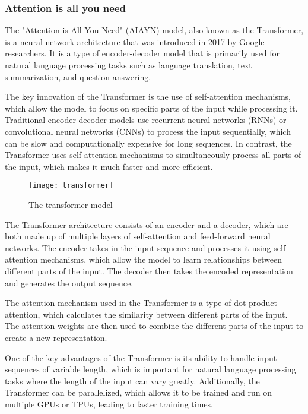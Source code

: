 \subsubsection{Attention is all you need}

The "Attention is All You Need" (AIAYN) model, also known as the Transformer, is a neural network architecture that was introduced in 2017 by Google researchers.
It is a type of encoder-decoder model that is primarily used for natural language processing tasks such as language translation, text summarization, and question answering.

The key innovation of the Transformer is the use of self-attention mechanisms, which allow the model to focus on specific parts of the input while processing it.
Traditional encoder-decoder models use recurrent neural networks (RNNs) or convolutional neural networks (CNNs) to process the input sequentially, which can be slow and computationally expensive for long sequences.
In contrast, the Transformer uses self-attention mechanisms to simultaneously process all parts of the input, which makes it much faster and more efficient.

\begin{figure}[h!]
  \centering
  \texttt{[image: transformer]}
  \caption{The transformer model \cite{vaswani}}
\end{figure}

The Transformer architecture consists of an encoder and a decoder, which are both made up of multiple layers of self-attention and feed-forward neural networks.
The encoder takes in the input sequence and processes it using self-attention mechanisms, which allow the model to learn relationships between different parts of the input.
The decoder then takes the encoded representation and generates the output sequence.

The attention mechanism used in the Transformer is a type of dot-product attention, which calculates the similarity between different parts of the input.
The attention weights are then used to combine the different parts of the input to create a new representation.

One of the key advantages of the Transformer is its ability to handle input sequences of variable length, which is important for natural language processing tasks where the length of the input can vary greatly.
Additionally, the Transformer can be parallelized, which allows it to be trained and run on multiple GPUs or TPUs, leading to faster training times.

